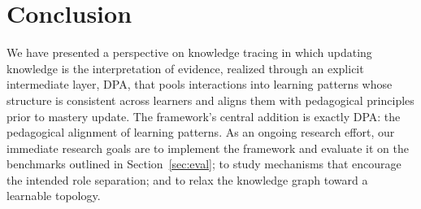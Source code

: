 \documentclass[conference]{IEEEtran}
\begin{document}
\section{Conclusion}
\label{sec:conclusion}

We have presented a perspective on knowledge tracing in which updating knowledge is the interpretation of evidence, realized through an explicit intermediate layer, DPA, that pools interactions into learning patterns whose structure is consistent across learners and aligns them with pedagogical principles prior to mastery update. The framework's central addition is exactly DPA: the pedagogical alignment of learning patterns. As an ongoing research effort, our immediate research goals are to implement the framework and evaluate it on the benchmarks outlined in Section~\ref{sec:eval}; to study mechanisms that encourage the intended role separation; and to relax the knowledge graph toward a learnable topology.



\end{document}
